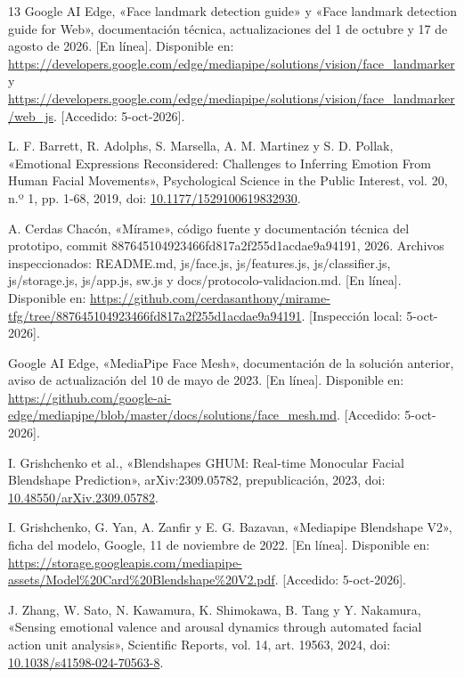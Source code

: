 \documentclass[conference,letterpaper]{IEEEtran}
\begin{document}
\clearpage
{}
\begin{thebibliography}{13}
 Google AI Edge, «Face landmark detection guide» y «Face landmark detection guide for Web», documentación técnica, actualizaciones del 1 de octubre y 17 de agosto de 2026. [En línea]. Disponible en: \url{https://developers.google.com/edge/mediapipe/solutions/vision/face_landmarker} y \url{https://developers.google.com/edge/mediapipe/solutions/vision/face_landmarker/web_js}. [Accedido: 5-oct-2026].

 L. F. Barrett, R. Adolphs, S. Marsella, A. M. Martinez y S. D. Pollak, «Emotional Expressions Reconsidered: Challenges to Inferring Emotion From Human Facial Movements», Psychological Science in the Public Interest, vol. 20, n.º 1, pp. 1-68, 2019, doi: \href{https://doi.org/10.1177/1529100619832930}{10.1177/1529100619832930}.

 A. Cerdas Chacón, «Mírame», código fuente y documentación técnica del prototipo, commit 887645104923466fd817a2f255d1acdae9a94191, 2026. Archivos inspeccionados: README.md, js/face.js, js/features.js, js/classifier.js, js/storage.js, js/app.js, sw.js y docs/protocolo-validacion.md. [En línea]. Disponible en: \url{https://github.com/cerdasanthony/mirame-tfg/tree/887645104923466fd817a2f255d1acdae9a94191}. [Inspección local: 5-oct-2026].

 Google AI Edge, «MediaPipe Face Mesh», documentación de la solución anterior, aviso de actualización del 10 de mayo de 2023. [En línea]. Disponible en: \url{https://github.com/google-ai-edge/mediapipe/blob/master/docs/solutions/face_mesh.md}. [Accedido: 5-oct-2026].

 I. Grishchenko et al., «Blendshapes GHUM: Real-time Monocular Facial Blendshape Prediction», arXiv:2309.05782, prepublicación, 2023, doi: \href{https://doi.org/10.48550/arXiv.2309.05782}{10.48550/arXiv.2309.05782}.

 I. Grishchenko, G. Yan, A. Zanfir y E. G. Bazavan, «Mediapipe Blendshape V2», ficha del modelo, Google, 11 de noviembre de 2022. [En línea]. Disponible en: \url{https://storage.googleapis.com/mediapipe-assets/Model%20Card%20Blendshape%20V2.pdf}. [Accedido: 5-oct-2026].

 J. Zhang, W. Sato, N. Kawamura, K. Shimokawa, B. Tang y Y. Nakamura, «Sensing emotional valence and arousal dynamics through automated facial action unit analysis», Scientific Reports, vol. 14, art. 19563, 2024, doi: \href{https://doi.org/10.1038/s41598-024-70563-8}{10.1038/s41598-024-70563-8}.


\end{thebibliography}
\end{document}
